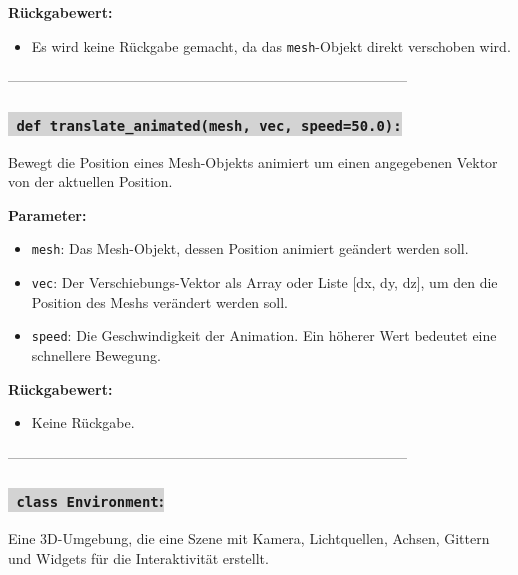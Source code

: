 \noindent \textbf{Rückgabewert:} \vspace{-6ex} \\
\begin{itemize}
    \setlength{\itemindent}{1em}
    \item Es wird keine Rückgabe gemacht, da das \texttt{mesh}-Objekt direkt verschoben wird.
\end{itemize}

--------------------------------------------------------------------------------------


\subsubsection*{\colorbox{lightgray}{\texttt{\textbf{\color{green} def} \color{blue} translate\_animated}\textbf{\texttt{(mesh, vec, speed=50.0):}}}}
Bewegt die Position eines Mesh-Objekts animiert um einen angegebenen Vektor von der aktuellen Position.

\noindent \textbf{Parameter:} \vspace{-6ex} \\
\begin{itemize}
    \setlength{\itemindent}{1em}  %
    \item \texttt{mesh}: Das Mesh-Objekt, dessen Position animiert geändert werden soll.
    \item \texttt{vec}: Der Verschiebungs-Vektor als Array oder Liste [dx, dy, dz], um den die Position des Meshs verändert werden soll.
    \item \texttt{speed}: Die Geschwindigkeit der Animation. Ein höherer Wert bedeutet eine schnellere Bewegung.
\end{itemize}

\noindent \textbf{Rückgabewert:} \vspace{-6ex} \\
\begin{itemize}
    \setlength{\itemindent}{1em}  %
    \item Keine Rückgabe.
\end{itemize}

--------------------------------------------------------------------------------------


\subsubsection*{\colorbox{lightgray}{\texttt{\textbf{\color{green} class} \color{blue} Environment}\textbf{:}}}
Eine 3D-Umgebung, die eine Szene mit Kamera, Lichtquellen, Achsen, Gittern und Widgets für die Interaktivität erstellt.

